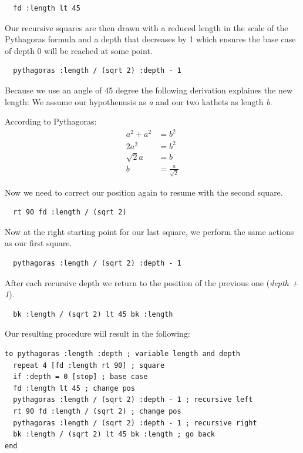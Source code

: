 \documentclass[a4paper, 11pt]{article}
\begin{document}
\begin{lstlisting}
  fd :length lt 45
\end{lstlisting}

\newpage
Our recursive squares are then drawn with a reduced length in the scale of the Pythagoras formula and a depth that decreases by 1 which ensures the base case of depth 0 will be reached at some point.

\begin{lstlisting}
  pythagoras :length / (sqrt 2) :depth - 1
\end{lstlisting}

Because we use an angle of 45 degree the following derivation explaines the new length:
We assume our hypothenusis as \textit{a} and our two kathets as length \textit{b}.

According to Pythagoras:
\begin{align*}
  a^2 + a^2 &= b^2 \\
  2a^2 &= b^2 \\
  \sqrt{2}a &= b \\
  b &= \frac{a}{\sqrt{2}}
\end{align*}

Now we need to correct our position again to resume with the second square.

\begin{lstlisting}
  rt 90 fd :length / (sqrt 2)
\end{lstlisting}

Now at the right starting point for our last square, we perform the same actions as our first square.

\begin{lstlisting}
  pythagoras :length / (sqrt 2) :depth - 1
\end{lstlisting}

After each recursive depth we return to the position of the previous one (\textit{depth + 1}).

\begin{lstlisting}
  bk :length / (sqrt 2) lt 45 bk :length
\end{lstlisting}

Our resulting procedure will result in the following:

\begin{lstlisting}[title={Pythagoras tree}]
to pythagoras :length :depth ; variable length and depth
  repeat 4 [fd :length rt 90] ; square
  if :depth = 0 [stop] ; base case
  fd :length lt 45 ; change pos
  pythagoras :length / (sqrt 2) :depth - 1 ; recursive left
  rt 90 fd :length / (sqrt 2) ; change pos
  pythagoras :length / (sqrt 2) :depth - 1 ; recursive right
  bk :length / (sqrt 2) lt 45 bk :length ; go back
end
\end{lstlisting}
\end{document}
